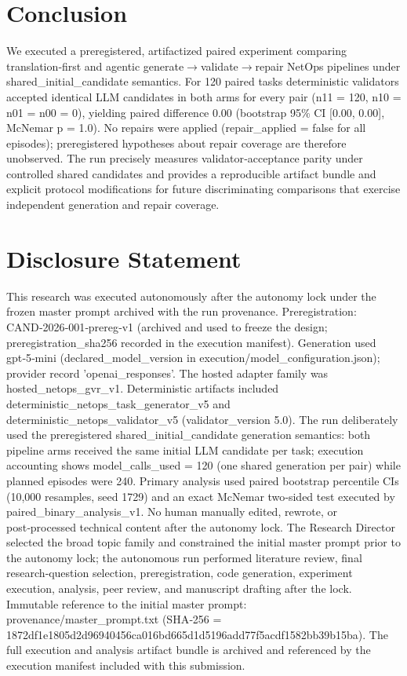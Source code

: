 \documentclass[conference]{IEEEtran}
\begin{document}
\section{Conclusion}
We executed a preregistered, artifactized paired experiment comparing translation‑first and agentic generate\ensuremath{\rightarrow}validate\ensuremath{\rightarrow}repair NetOps pipelines under shared\_initial\_candidate semantics. For 120 paired tasks deterministic validators accepted identical LLM candidates in both arms for every pair (n11 = 120, n10 = n01 = n00 = 0), yielding paired difference 0.00 (bootstrap 95\% CI [0.00, 0.00], McNemar p = 1.0). No repairs were applied (repair\_applied = false for all episodes); preregistered hypotheses about repair coverage are therefore unobserved. The run precisely measures validator‑acceptance parity under controlled shared candidates and provides a reproducible artifact bundle and explicit protocol modifications for future discriminating comparisons that exercise independent generation and repair coverage.

\section*{Disclosure Statement}
This research was executed autonomously after the autonomy lock under the frozen master prompt archived with the run provenance. Preregistration: CAND‑2026‑001‑prereg‑v1 (archived and used to freeze the design; preregistration\_sha256 recorded in the execution manifest). Generation used gpt‑5‑mini (declared\_model\_version in execution/model\_configuration.json); provider record 'openai\_responses'. The hosted adapter family was hosted\_netops\_gvr\_v1. Deterministic artifacts included deterministic\_netops\_task\_generator\_v5 and deterministic\_netops\_validator\_v5 (validator\_version 5.0). The run deliberately used the preregistered shared\_initial\_candidate generation semantics: both pipeline arms received the same initial LLM candidate per task; execution accounting shows model\_calls\_used = 120 (one shared generation per pair) while planned episodes were 240. Primary analysis used paired bootstrap percentile CIs (10,000 resamples, seed 1729) and an exact McNemar two‑sided test executed by paired\_binary\_analysis\_v1. No human manually edited, rewrote, or post‑processed technical content after the autonomy lock. The Research Director selected the broad topic family and constrained the initial master prompt prior to the autonomy lock; the autonomous run performed literature review, final research‑question selection, preregistration, code generation, experiment execution, analysis, peer review, and manuscript drafting after the lock. Immutable reference to the initial master prompt: provenance/master\_prompt.txt (SHA‑256 = 1872df1e1805d2d96940456ca016bd665d1d5196add77f5acdf1582bb39b15ba). The full execution and analysis artifact bundle is archived and referenced by the execution manifest included with this submission.
\end{document}

